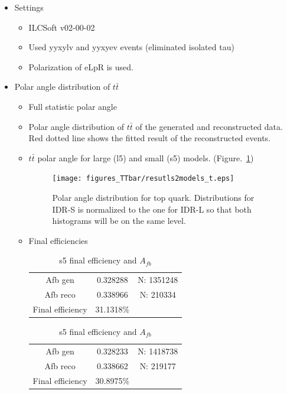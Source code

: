\documentclass[preprint]{elsarticle}
\begin{document}
\begin{itemize}

\item Settings
  \begin{itemize}
  \item ILCSoft v02-00-02
  \item Used yyxylv and yyxyev events (eliminated isolated tau)
  \item Polarization of eLpR is used.
  \end{itemize}
  
\item Polar angle distribution of $t\bar{t}$
  \begin{itemize}
  \item Full statistic polar angle
  \item Polar angle distribution of $t\bar{t}$ of the generated and reconstructed data. Red dotted line shows the fitted result of the reconstructed events.
  \item $t\bar{t}$ polar angle for large (l5) and small (s5) models. (Figure.~\ref{compare})
      
  \begin{figure}[h!]
    \centering
    \texttt{[image: figures\_TTbar/resutls2models\_t.eps]} 
    \caption{Polar angle distribution for top quark. Distributions for IDR-S is normalized to the one for IDR-L so that both histograms will be on the same level. }
    \label{compare}
  \end{figure}

    \item Final efficiencies
    
  \begin{table}[h!]
    \parbox{.45\linewidth}{
    \centering
    \begin{tabular}{ccc}
      \hline
      \hline
      	Afb gen				&	0.328288		&	N: 1351248		\\
      	Afb reco			&	0.338966		&	N: 210334		\\
      	Final efficiency	&	31.1318\%	&				\\		
      \hline
      \hline
    \end{tabular}
    \caption{l5 final efficiency and $A_{fb}$}
    }
    \hfill
    \parbox{.45\linewidth}{
    \centering
    \begin{tabular}{ccc}
      \hline
      \hline
      	Afb gen				&	0.328233		&	N: 1418738		\\
      	Afb reco			&	0.338662		&	N: 219177		\\
      	Final efficiency	&	30.8975\%	&				\\		
      \hline
      \hline
  \end{tabular}
  \caption{s5 final efficiency and $A_{fb}$}
  }
  \end{table}
  

\end{itemize}
\end{itemize}
\end{document}
